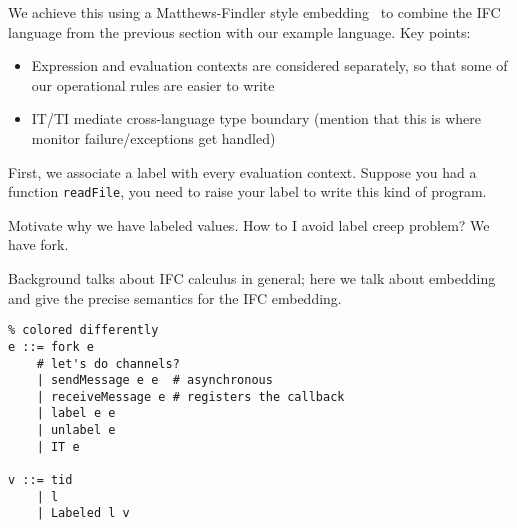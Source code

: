 {We achieve this using a Matthews-Findler style embedding~\nocite{} to combine
the IFC language from the previous section with our example language.  Key points:


\begin{itemize}
    \item Expression and evaluation contexts are considered separately,
        so that some of our operational rules are easier to write
    \item IT/TI mediate cross-language type boundary (mention that this
        is where monitor failure/exceptions get handled)
\end{itemize}

First, we associate a label with every evaluation context.  Suppose you had
a function \verb|readFile|, you need to raise your label to write this
kind of program.

Motivate why we have labeled values. How to I avoid label creep problem? We
have fork. 

Background talks about IFC calculus in general; here we talk about
embedding and give the precise semantics for the IFC embedding.



\begin{verbatim}
% colored differently
e ::= fork e
    # let's do channels?
    | sendMessage e e  # asynchronous
    | receiveMessage e # registers the callback
    | label e e
    | unlabel e
    | IT e

v ::= tid
    | l
    | Labeled l v
\end{verbatim}


%

}

